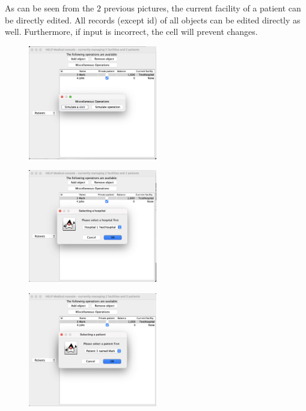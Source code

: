 \documentclass{article}
\begin{document}
As can be seen from the $2$ previous pictures, the current facility of a patient can be directly edited. All records (except id) of all objects can be edited directly as well. Furthermore, if input is incorrect, the cell will prevent changes.

\begin{figure}
  \begin{center}
    \includegraphics[width=0.5\textwidth]{./figures/Operation/Operation_3.png}
  \end{center}
\end{figure}

\begin{figure}
  \begin{center}
    \includegraphics[width=0.5\textwidth]{./figures/Operation/Operation_4.png}
  \end{center}
\end{figure}

\begin{figure}
  \begin{center}
    \includegraphics[width=0.5\textwidth]{./figures/Operation/Operation_5.png}
  \end{center}
\end{figure}
\end{document}

